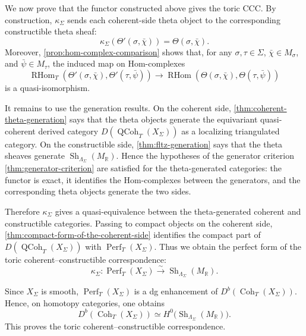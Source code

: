 We now prove that the functor constructed above gives the toric CCC. By
construction, \(\kappa_\Sigma\) sends each coherent-side theta object to the
corresponding constructible theta sheaf:
\[
\kappa_\Sigma(\Theta'(\sigma,\bar\chi))=\Theta(\sigma,\bar\chi).
\]
Moreover, \cref{prop:hom-complex-comparison} shows that, for any
\(\sigma,\tau\in\Sigma\), \(\bar\chi\in M_\sigma\), and
\(\bar\psi\in M_\tau\), the induced map on Hom-complexes
\[
\operatorname{RHom}_T(\Theta'(\sigma,\bar\chi),\Theta'(\tau,\bar\psi))
\longrightarrow
\operatorname{RHom}(\Theta(\sigma,\bar\chi),\Theta(\tau,\bar\psi))
\]
is a quasi-isomorphism.

It remains to use the generation results. On the coherent side,
\cref{thm:coherent-theta-generation} says that the theta objects generate the
equivariant quasi-coherent derived category
\(D(\operatorname{QCoh}_T(X_\Sigma))\) as a localizing triangulated category.
On the constructible side, \cref{thm:fltz-generation} says that the theta
sheaves generate \(\operatorname{Sh}_{\Lambda_\Sigma}(M_{\mathbb R})\). Hence
the hypotheses of the generator criterion
\cref{thm:generator-criterion} are satisfied for the theta-generated
categories: the functor is exact, it identifies the Hom-complexes between the
generators, and the corresponding theta objects generate the two sides.

Therefore \(\kappa_\Sigma\) gives a quasi-equivalence between the
theta-generated coherent and constructible categories. Passing to compact
objects on the coherent side, \cref{thm:compact-form-of-the-coherent-side}
identifies the compact part of \(D(\operatorname{QCoh}_T(X_\Sigma))\) with
\(\operatorname{Perf}_T(X_\Sigma)\). Thus we obtain the perfect form of the
toric coherent--constructible correspondence:
\[
\kappa_\Sigma:
\operatorname{Perf}_T(X_\Sigma)
\xrightarrow{\sim}
\operatorname{Sh}_{\Lambda_\Sigma}(M_{\mathbb R}).
\]

Since \(X_\Sigma\) is smooth, \(\operatorname{Perf}_T(X_\Sigma)\) is a dg
enhancement of \(D^b(\operatorname{Coh}_T(X_\Sigma))\). Hence, on homotopy
categories, one obtains
\[
D^b(\operatorname{Coh}_T(X_\Sigma))
\simeq
H^0\bigl(\operatorname{Sh}_{\Lambda_\Sigma}(M_{\mathbb R})\bigr).
\]
This proves the toric coherent--constructible correspondence.
